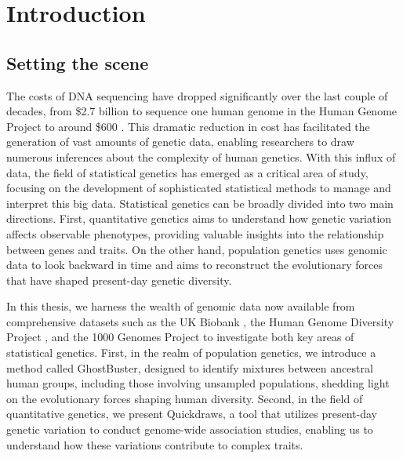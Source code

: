 \chapter{\label{ch:1-intro}Introduction} 

\minitoc

\section{Setting the scene}

The costs of DNA sequencing have dropped significantly over the last couple of decades, from \$2.7 billion to sequence one human genome in the Human Genome Project \cite{Collins2003} to around \$600 \cite{Wetterstrand2022}. This dramatic reduction in cost has facilitated the generation of vast amounts of genetic data, enabling researchers to draw numerous inferences about the complexity of human genetics. With this influx of data, the field of statistical genetics has emerged as a critical area of study, focusing on the development of sophisticated statistical methods to manage and interpret this big data. Statistical genetics can be broadly divided into two main directions. First, quantitative genetics aims to understand how genetic variation affects observable phenotypes, providing valuable insights into the relationship between genes and traits. On the other hand, population genetics uses genomic data to look backward in time and aims to reconstruct the evolutionary forces that have shaped present-day genetic diversity.

In this thesis, we harness the wealth of genomic data now available from comprehensive datasets such as the UK Biobank \cite{bycroft2018uk}, the Human Genome Diversity Project \cite{cann2002human}, and the 1000 Genomes Project \cite{10002015global} to investigate both key areas of statistical genetics. First, in the realm of population genetics, we introduce a method called GhostBuster, designed to identify mixtures between ancestral human groups, including those involving unsampled populations, shedding light on the evolutionary forces shaping human diversity. Second, in the field of quantitative genetics, we present Quickdraws, a tool that utilizes present-day genetic variation to conduct genome-wide association studies, enabling us to understand how these variations contribute to complex traits.

